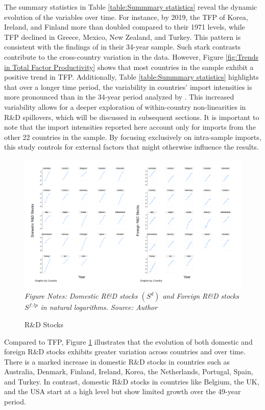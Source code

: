 \documentclass[12pt]{article}
\begin{document}
The summary statistics in Table \ref{table:Summmary statistics} reveal the dynamic evolution of the variables over time. For instance, by 2019, the TFP of Korea, Ireland, and Finland more than doubled compared to their 1971 levels, while TFP declined in Greece, Mexico, New Zealand, and Turkey. This pattern is consistent with the findings of \citet{Coe2009} in their 34-year sample. Such stark contrasts contribute to the cross-country variation in the data. However, Figure \ref{fig:Trends in Total Factor Productivity} shows that most countries in the sample exhibit a positive trend in TFP. Additionally, Table \ref{table:Summmary statistics} highlights that over a longer time period, the variability in countries' import intensities is more pronounced than in the 34-year period analyzed by \citet{Coe2009}. This increased variability allows for a deeper exploration of within-country non-linearities in R\&D spillovers, which will be discussed in subsequent sections. It is important to note that the import intensities reported here account only for imports from the other 22 countries in the sample. By focusing exclusively on intra-sample imports, this study controls for external factors that might otherwise influence the results.

\begin{figure}[h!]
    \centering
    \caption{R\&D Stocks}
     \includegraphics[width=1\linewidth]{R&D Stocks.png}
    \label{fig:KS}
    \textit{Figure Notes: Domestic R\&D stocks $(S^d)$ and Foreign R\&D stocks $S^{f:lp}$ in natural logarithms. Source: Author}
\end{figure}

Compared to TFP, Figure \ref{fig:KS} illustrates that the evolution of both domestic and foreign R\&D stocks exhibits greater variation across countries and over time. There is a marked increase in domestic R\&D stocks in countries such as Australia, Denmark, Finland, Ireland, Korea, the Netherlands, Portugal, Spain, and Turkey. In contrast, domestic R\&D stocks in countries like Belgium, the UK, and the USA start at a high level but show limited growth over the 49-year period.
\end{document}
